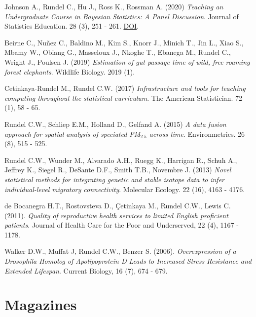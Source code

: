 \documentclass[margin,line]{res}
\begin{document}
\begin{resume}
\vspace{-0.15cm}
Johnson A., Rundel C., Hu J., Ross K., Rossman A. (2020) {\em Teaching an Undergraduate Course in Bayesian Statistics: A Panel Discussion}. Journal of Statistics Education. 28 (3), 251 - 261. \href{https://doi.org/10.1080/10691898.2020.1845499}{DOI}.


\vspace{-0.15cm}
Beirne C., Nuñez C., Baldino M., Kim S., Knorr J., Minich T., Jin L., Xiao S., Mbamy W., Obiang G., Masseloux J., Nkoghe T., Ebanega M., Rundel C., Wright J., Poulsen J. (2019) {\em Estimation of gut passage time of wild, free roaming forest elephants}. Wildlife Biology. 2019 (1).

\vspace{-0.15cm}
Cetinkaya-Rundel M., Rundel C.W. (2017) {\em Infrastructure and tools for teaching computing throughout the statistical curriculum}. The American Statistician. 72 (1), 58 - 65.

\vspace{-0.15cm}
Rundel C.W., Schliep E.M., Holland D., Gelfand A. (2015) {\em A data fusion approach for spatial analysis of speciated PM$_{2.5}$ across time}. Environmetrics. 26 (8), 515 - 525.

\vspace{-0.15cm}
Rundel C.W., Wunder M., Alvarado A.H., Ruegg K., Harrigan R., Schuh A., Jeffrey K., Siegel R., DeSante D.F., Smith T.B., Novembre J. (2013) {\em Novel statistical methods for integrating genetic and stable isotope data to infer individual-level migratory connectivity}. Molecular Ecology. 22 (16), 4163 - 4176.

\vspace{-0.15cm}
de Bocanegra H.T., Rostovsteva D., \c{C}etinkaya M., Rundel C.W., Lewis C. (2011). {\em Quality of reproductive health services to limited English proficient patients}. Journal of Health Care for the Poor and Underserved, 22 (4), 1167 - 1178.

\vspace{-0.15cm}
Walker D.W., Muffat J, Rundel C.W., Benzer S. (2006). {\em Overexpression of a Drosophila Homolog of Apolipoprotein D Leads to Increased Stress Resistance and Extended Lifespan}. Current Biology, 16 (7), 674 - 679.


\vspace{4mm}

%

\section{\sc Magazines}


\end{resume}
\end{document}
